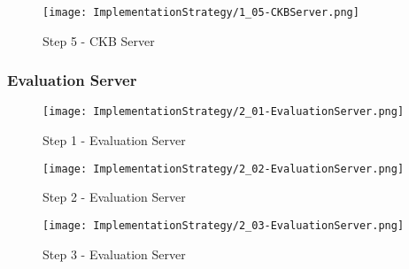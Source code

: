 \begin{figure}[H]
    \label{fig:step5-CKBServer}
    \centering
    \texttt{[image: ImplementationStrategy/1\_05-CKBServer.png]}
    \caption{Step 5 - CKB Server}
\end{figure}


\subsubsection{Evaluation Server}

\begin{figure}[H]
    \label{fig:step1-EvaluationServer}
    \centering
    \texttt{[image: ImplementationStrategy/2\_01-EvaluationServer.png]}
    \caption{Step 1 - Evaluation Server}
\end{figure}

\begin{figure}[H]
    \label{fig:step2-EvaluationServer}
    \centering
    \texttt{[image: ImplementationStrategy/2\_02-EvaluationServer.png]}
    \caption{Step 2 - Evaluation Server}
\end{figure}

\begin{figure}[H]
    \label{fig:step3-EvaluationServer}
    \centering
    \texttt{[image: ImplementationStrategy/2\_03-EvaluationServer.png]}
    \caption{Step 3 - Evaluation Server}
\end{figure}

